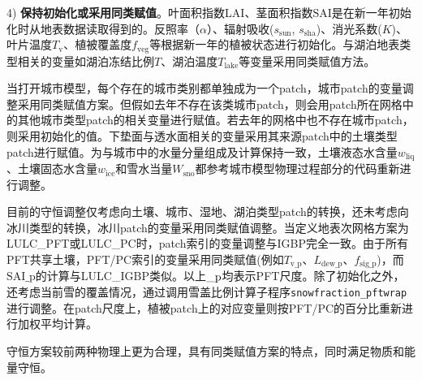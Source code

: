 4) \textbf{保持初始化或采用同类赋值}。叶面积指数LAI、茎面积指数${\mathrm {SAI}}$是在新一年初始化时从地表数据读取得到的。反照率（$\alpha$）、辐射吸收($s_{\mathrm {sun}}$, $s_{\mathrm {sha}}$)、消光系数($K$)、叶片温度$T_{\mathrm{v}}$、植被覆盖度$f_{\mathrm{veg}}$等根据新一年的植被状态进行初始化。与湖泊地表类型相关的变量如湖泊冻结比例$T$、湖泊温度$T_{\mathrm{lake}}$等变量采用同类赋值方法。

当打开城市模型，每个存在的城市类别都单独成为一个patch，城市patch的变量调整采用同类赋值方案。但假如去年不存在该类城市patch，则会用patch所在网格中的其他城市类型patch的相关变量进行赋值。若去年的网格中也不存在城市patch，则采用初始化的值。下垫面与透水面相关的变量采用其来源patch中的土壤类型patch进行赋值。为与城市中的水量分量组成及计算保持一致，土壤液态水含量$w_{\mathrm{liq}}$、土壤固态水含量$w_{\mathrm{ice}}$和雪水当量$W_{\mathrm{sno}}$都参考城市模型物理过程部分的代码重新进行调整。

目前的守恒调整仅考虑向土壤、城市、湿地、湖泊类型patch的转换，还未考虑向冰川类型的转换，冰川patch的变量采用同类赋值调整。当定义地表次网格方案为LULC\_PFT或LULC\_PC时，patch索引的变量调整与IGBP完全一致。由于所有PFT共享土壤，PFT/PC索引的变量采用同类赋值(例如$T_{\mathrm{v\_p}}$、$L_{\mathrm{dew\_p}}$、$f_{\mathrm{sig\_p}}$)，而$\mathrm{SAI\_p}$的计算与LULC\_IGBP类似。以上$\_{\rm p}$均表示PFT尺度。除了初始化之外，还考虑当前雪的覆盖情况，通过调用雪盖比例计算子程序\texttt{snowfraction\_pftwrap}进行调整。在patch尺度上，植被patch上的对应变量则按PFT/PC的百分比重新进行加权平均计算。

守恒方案较前两种物理上更为合理，具有同类赋值方案的特点，同时满足物质和能量守恒。
